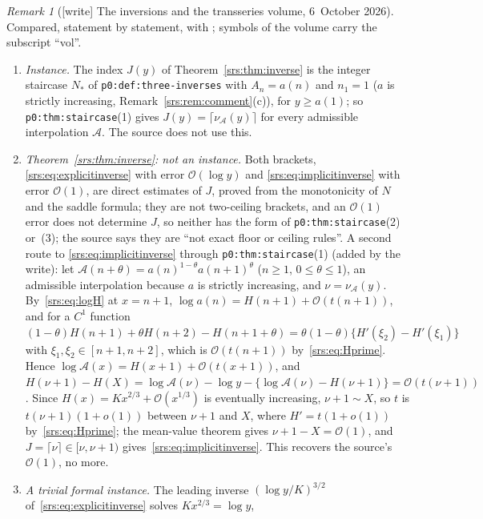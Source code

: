 \documentclass[11pt]{article}
\numberwithin{equation}{section}
\theoremstyle{remark}\newtheorem{remark}[theorem]{Remark}
\newcommand{\Oh}{\mathcal O}
\newcommand{\file}[1]{\nolinkurl{#1}}
\begin{document}
\begin{remark}[{[write]} The inversions and the transseries volume, 6~October 2026]\label{srs:rem:transseries}
Compared, statement by statement, with
;
symbols of the volume carry the subscript ``vol''.
\begin{enumerate}[label=(\alph*)]
\item \emph{Instance.} The index $J(y)$ of Theorem~\ref{srs:thm:inverse} is
 the integer staircase $N_\ast$ of \file{p0:def:three-inverses} with
 $A_n=a(n)$ and $n_1=1$ ($a$ is strictly increasing,
 Remark~\ref{srs:rem:comment}(c)), for $y\ge a(1)$; so
 \file{p0:thm:staircase}(1) gives $J(y)=\lceil\nu_{\mathcal A}(y)\rceil$ for
 every admissible interpolation $\mathcal A$. The source does not use this.
\item \emph{Theorem~\ref{srs:thm:inverse}: not an instance.} Both brackets,
 \eqref{srs:eq:explicitinverse} with error $\Oh(\log y)$ and
 \eqref{srs:eq:implicitinverse} with error $\Oh(1)$, are direct estimates of
 $J$, proved from the monotonicity of $N$ and the saddle formula; they are
 not two-ceiling brackets, and an $\Oh(1)$ error does not determine $J$, so
 neither has the form of \file{p0:thm:staircase}(2) or~(3); the source says
 they are ``not exact floor or ceiling rules''. A second route to
 \eqref{srs:eq:implicitinverse} through \file{p0:thm:staircase}(1) (added by
 the write): let $\mathcal A(n+\theta)=a(n)^{1-\theta}a(n+1)^{\theta}$
 ($n\ge1$, $0\le\theta\le1$), an admissible interpolation because $a$ is
 strictly increasing, and $\nu=\nu_{\mathcal A}(y)$. By~\eqref{srs:eq:logH}
 at $x=n+1$, $\log a(n)=H(n+1)+\Oh(t(n+1))$, and for a $C^1$ function
 $(1-\theta)H(n+1)+\theta H(n+2)-H(n+1+\theta)=\theta(1-\theta)\{H'(\xi_2)-H'(\xi_1)\}$
 with $\xi_1,\xi_2\in[n+1,n+2]$, which is $\Oh(t(n+1))$
 by~\eqref{srs:eq:Hprime}. Hence $\log\mathcal A(x)=H(x+1)+\Oh(t(x+1))$, and
 $H(\nu+1)-H(X)=\log\mathcal A(\nu)-\log y-\{\log\mathcal A(\nu)-H(\nu+1)\}=\Oh(t(\nu+1))$.
 Since $H(x)=Kx^{2/3}+\Oh(x^{1/3})$ is eventually increasing, $\nu+1\sim X$,
 so $t$ is $t(\nu+1)(1+o(1))$ between $\nu+1$ and $X$, where $H'=t(1+o(1))$
 by~\eqref{srs:eq:Hprime}; the mean-value theorem gives $\nu+1-X=\Oh(1)$, and
 $J=\lceil\nu\rceil\in[\nu,\nu+1)$ gives~\eqref{srs:eq:implicitinverse}. This
 recovers the source's $\Oh(1)$, no more.
\item \emph{A trivial formal instance.} The leading inverse
 $(\log y/K)^{3/2}$ of~\eqref{srs:eq:explicitinverse} solves $Kx^{2/3}=\log y$,

\end{enumerate}
\end{remark}
\end{document}
